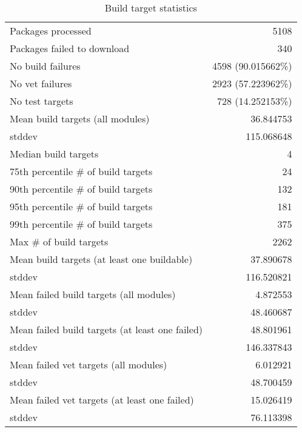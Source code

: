 \begin{table}[ht]
\caption{Build target statistics}
\label{table:build}
\begin{tabular}{|l|r|}
 \hline
  Packages processed & 5108 \\
  Packages failed to download & 340 \\
  No build failures & 4598 (90.015662\%) \\
  No vet failures & 2923 (57.223962\%) \\
  No test targets & 728 (14.252153\%) \\
 \hline
  Mean build targets (all modules)& 36.844753 \\
  stddev & 115.068648 \\
  Median build targets & 4 \\
  75th percentile \# of build targets & 24 \\
  90th percentile \# of build targets & 132 \\
  95th percentile \# of build targets & 181 \\
  99th percentile \# of build targets & 375 \\
  Max \# of build targets & 2262 \\
 \hline
  Mean build targets (at least one buildable)& 37.890678 \\
  stddev & 116.520821 \\
 \hline
  Mean failed build targets (all modules)& 4.872553 \\
  stddev & 48.460687 \\
 \hline
  Mean failed build targets (at least one failed)& 48.801961 \\
  stddev & 146.337843 \\
 \hline
  Mean failed vet targets (all modules)& 6.012921 \\
  stddev & 48.700459 \\
 \hline
  Mean failed vet targets (at least one failed)& 15.026419 \\
  stddev & 76.113398 \\
 \hline
\end{tabular}
\end{table}

